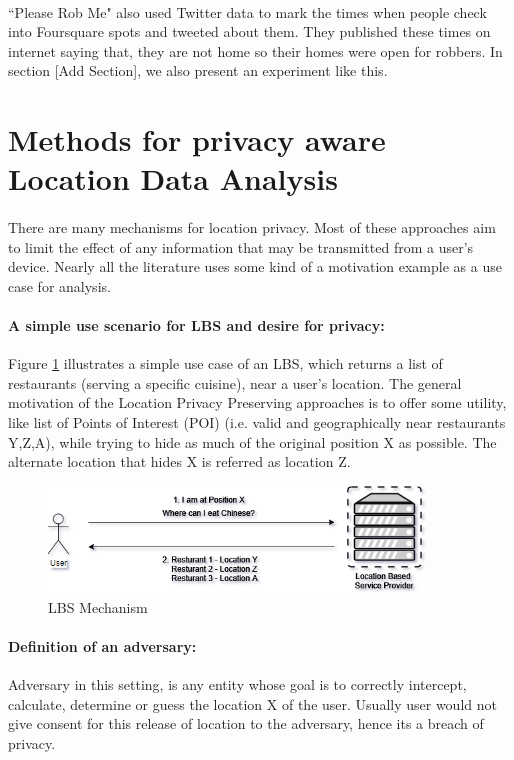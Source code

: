 \documentclass[12pt]{report}
\theoremstyle{named}
\begin{document}
\paragraph{}
``Please Rob Me"\cite{PleaseRobMe} also used Twitter data to mark the times when people check into Foursquare\cite{Foursquare} spots and tweeted about them. They published these times on internet saying that, they are not home so their homes were open for robbers. In section [Add Section], we also present an experiment like this.

\section{Methods for privacy aware Location Data Analysis}
\label{sec:MethodsForLocationPrivacy}
\paragraph{}
There are many mechanisms for location privacy. Most of these approaches aim to limit the effect of any information that may be transmitted from a user's device. Nearly all the literature uses some kind of a motivation example as a use case for analysis.
\paragraph{A simple use scenario for LBS and desire for privacy:}

Figure \ref{fig:LBSMechanism} illustrates a simple use case of an LBS, which returns a list of restaurants (serving a specific cuisine), near a user's location. The general motivation of the Location Privacy Preserving approaches is to offer some utility, like list of Points of Interest (POI) (i.e. valid and geographically near restaurants Y,Z,A), while trying to hide as much of the original position X as possible. The alternate location that hides X is referred as location Z.
\begin{figure}[ht]
\centering
        \includegraphics[width=100mm,scale=0.5]{Images/LBS-Scenario.png}
    \caption{LBS Mechanism}
    \label{fig:LBSMechanism}
\end{figure}

\paragraph{Definition of an adversary:}
Adversary in this setting, is any entity whose goal is to correctly intercept, calculate, determine or guess the location X of the user. Usually user would not give consent for this release of location to the adversary, hence its a breach of privacy.
\end{document}
